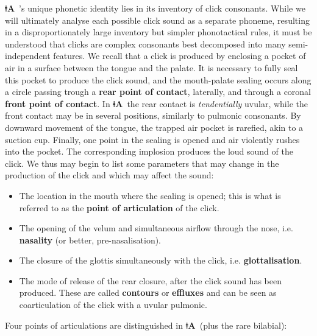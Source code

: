 \documentclass[11pt]{book}
\newcommand{\qcn}[1]{\textbf{#1}}
\newcommand{\langname}{\qcn{ǂA}~}
\begin{document}
\langname's unique phonetic identity lies in its inventory of click consonants. While we will ultimately analyse each possible click sound as a separate phoneme, resulting in a disproportionately large inventory but simpler phonotactical rules, it must be understood that clicks are complex consonants best decomposed into many semi-independent features. We recall that a click is produced by enclosing a pocket of air in a surface between the tongue and the palate. It is necessary to fully seal this pocket to produce the click sound, and the mouth-palate sealing occurs along a circle passing trough a \textbf{rear point of contact}, laterally, and through a coronal \textbf{front point of contact}. In \langname the rear contact is \emph{tendentially} uvular, while the front contact may be in several positions, similarly to pulmonic consonants. By downward movement of the tongue, the trapped air pocket is rarefied, akin to a suction cup. Finally, one point in the sealing is opened and air violently rushes into the pocket. The corresponding implosion produces the loud sound of the click. We thus may begin to list some parameters that may change in the production of the click and which may affect the sound:

\begin{itemize}
	\item The location in the mouth where the sealing is opened; this is what is referred to as the \textbf{point of articulation} of the click.
	\item The opening of the velum and simultaneous airflow through the nose, i.e. \textbf{nasality} (or better, pre-nasalisation).
	\item The closure of the glottis simultaneously with the click, i.e. \textbf{glottalisation}.
	\item The mode of release of the rear closure, after the click sound has been produced. These are called \textbf{contours} or \textbf{effluxes} and can be seen as coarticulation of the click with a uvular pulmonic.
\end{itemize}

Four points of articulations are distinguished in \langname (plus the rare bilabial):
\end{document}
